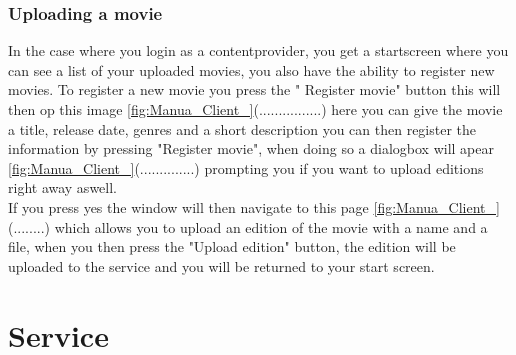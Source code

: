 \subsubsection{Uploading a movie}
\label{Manual_Client_Navigation_Upload}
In the case where you login as a contentprovider, you get a startscreen where you can see a list of your uploaded movies, you also have the ability to register new movies. To register a new movie you press the " Register movie" button this will then op this image \ref{fig:Manua_Client_}(................) here you can give the movie a title,  release date, genres and a short description you can then register the information by pressing "Register movie", when doing so a dialogbox will apear \ref{fig:Manua_Client_}(..............) prompting you if you want to upload editions right away aswell.
\\If you press yes the window will then navigate to this page \ref{fig:Manua_Client_}(........) which allows you to upload an edition of the movie with a name and a file, when you then press the "Upload edition" button, the edition will be uploaded to the service and you will be returned to your start screen.

\section{Service}
\label{Manual_Service}